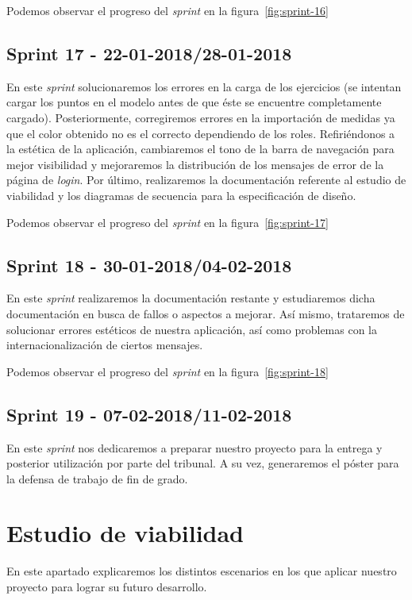 Podemos observar el progreso del \textit{sprint} en la figura~\ref{fig:sprint-16}

\subsection{Sprint 17 - 22-01-2018/28-01-2018}
En este \textit{sprint} solucionaremos los errores en la carga de los ejercicios (se intentan cargar los puntos en el modelo antes de que éste se encuentre completamente cargado). Posteriormente, corregiremos errores en la importación de medidas ya que el color obtenido no es el correcto dependiendo de los roles. Refiriéndonos a la estética de la aplicación, cambiaremos el tono de la barra de navegación para mejor visibilidad y mejoraremos la distribución de los mensajes de error de la página de \textit{login}. Por último, realizaremos la documentación referente al estudio de viabilidad y los diagramas de secuencia para la especificación de diseño.

Podemos observar el progreso del \textit{sprint} en la figura~\ref{fig:sprint-17}

\subsection{Sprint 18 - 30-01-2018/04-02-2018}
En este \textit{sprint} realizaremos la documentación restante y estudiaremos dicha documentación en busca de fallos o aspectos a mejorar. Así mismo, trataremos de solucionar errores estéticos de nuestra aplicación, así como problemas con la internacionalización de ciertos mensajes.

Podemos observar el progreso del \textit{sprint} en la figura~\ref{fig:sprint-18}

\subsection{Sprint 19 - 07-02-2018/11-02-2018}
En este \textit{sprint} nos dedicaremos a preparar nuestro proyecto para la entrega y posterior utilización por parte del tribunal. A su vez, generaremos el póster para la defensa de trabajo de fin de grado.

\section{Estudio de viabilidad}
En este apartado explicaremos los distintos escenarios en los que aplicar nuestro proyecto para lograr su futuro desarrollo.


